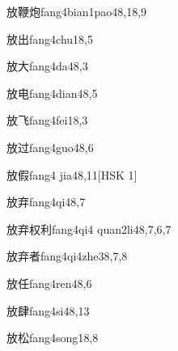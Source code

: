 \begin{entry}{放鞭炮}{fang4bian1pao4}{8,18,9}
\end{entry}

\begin{entry}{放出}{fang4chu1}{8,5}
\end{entry}

\begin{entry}{放大}{fang4da4}{8,3}
\end{entry}

\begin{entry}{放电}{fang4dian4}{8,5}
\end{entry}

\begin{entry}{放飞}{fang4fei1}{8,3}
\end{entry}

\begin{entry}{放过}{fang4guo4}{8,6}
\end{entry}

\begin{entry}{放假}{fang4 jia4}{8,11}[HSK 1]
\end{entry}

\begin{entry}{放弃}{fang4qi4}{8,7}
\end{entry}

\begin{entry}{放弃权利}{fang4qi4 quan2li4}{8,7,6,7}
\end{entry}

\begin{entry}{放弃者}{fang4qi4zhe3}{8,7,8}
\end{entry}

\begin{entry}{放任}{fang4ren4}{8,6}
\end{entry}

\begin{entry}{放肆}{fang4si4}{8,13}
\end{entry}

\begin{entry}{放松}{fang4song1}{8,8}
\end{entry}

